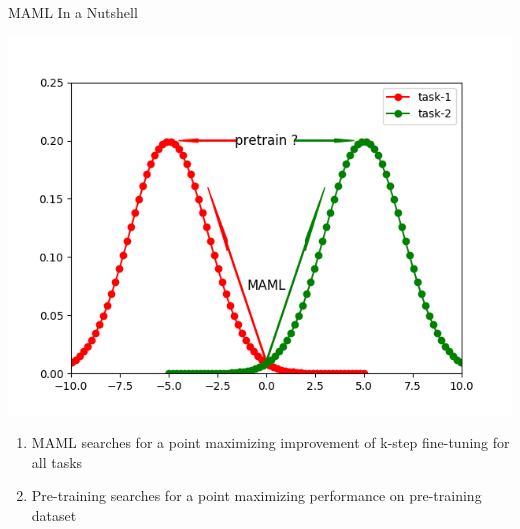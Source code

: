 \documentclass[compress]{beamer}
\begin{document}
\begin{frame}[t]{MAML In a Nutshell}
    \begin{center}
        \includegraphics[height=.5\textheight,width=.8\textwidth]{nutshell}
    \end{center}
    \begin{enumerate}
        \item MAML searches for a point maximizing improvement of k-step fine-tuning for all tasks
        \item Pre-training searches for a point maximizing performance on pre-training dataset
    \end{enumerate}
\end{frame}
\end{document}
